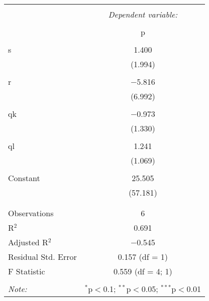 \documentclass[11pt, a4paper]{article}
\begin{document}
\begin{center}
\begin{tabular}{@{\extracolsep{5pt}}lc} 
\\[-1.8ex]\hline 
\hline \\[-1.8ex] 
 & \multicolumn{1}{c}{\textit{Dependent variable:}} \\ 
\cline{2-2}
\\[-1.8ex] & p \\ 
\hline \\[-1.8ex] 
 s & 1.400 \\ 
  & (1.994) \\ 
  & \\ 
 r & $-$5.816 \\ 
  & (6.992) \\ 
  & \\
 qk & $-$0.973 \\ 
  & (1.330) \\ 
  & \\
 ql & 1.241 \\ 
  & (1.069) \\ 
  & \\ 
 Constant & 25.505 \\ 
  & (57.181) \\ 
  & \\ 
\hline \\[-1.8ex] 
Observations & 6 \\ 
R$^{2}$ & 0.691 \\ 
Adjusted R$^{2}$ & $-$0.545 \\ 
Residual Std. Error & 0.157 (df = 1) \\ 
F Statistic & 0.559 (df = 4; 1) \\ 
\hline 
\hline \\[-1.8ex] 
\textit{Note:}  & \multicolumn{1}{r}{$^{*}$p$<$0.1; $^{**}$p$<$0.05; $^{***}$p$<$0.01} 
\\ 
\end{tabular}
\end{center}
\FloatBarrier
\end{document}
